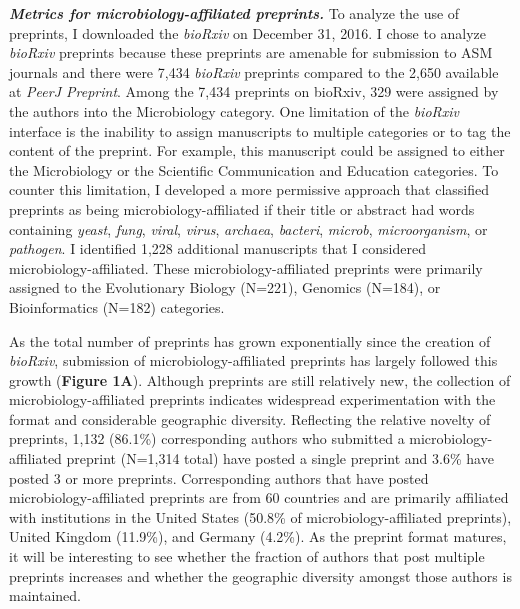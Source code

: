 \documentclass[11pt,]{article}
\begin{document}
\textbf{\emph{Metrics for microbiology-affiliated preprints.}} To
analyze the use of preprints, I downloaded the \emph{bioRxiv} on
December 31, 2016. I chose to analyze \emph{bioRxiv} preprints because
these preprints are amenable for submission to ASM journals and there
were 7,434 \emph{bioRxiv} preprints compared to the 2,650 available at
\emph{PeerJ Preprint}. Among the 7,434 preprints on bioRxiv, 329 were
assigned by the authors into the Microbiology category. One limitation
of the \emph{bioRxiv} interface is the inability to assign manuscripts
to multiple categories or to tag the content of the preprint. For
example, this manuscript could be assigned to either the Microbiology or
the Scientific Communication and Education categories. To counter this
limitation, I developed a more permissive approach that classified
preprints as being microbiology-affiliated if their title or abstract
had words containing \emph{yeast}, \emph{fung}, \emph{viral},
\emph{virus}, \emph{archaea}, \emph{bacteri}, \emph{microb},
\emph{microorganism}, or \emph{pathogen}. I identified 1,228 additional
manuscripts that I considered microbiology-affiliated. These
microbiology-affiliated preprints were primarily assigned to the
Evolutionary Biology (N=221), Genomics (N=184), or Bioinformatics
(N=182) categories.

As the total number of preprints has grown exponentially since the
creation of \emph{bioRxiv}, submission of microbiology-affiliated
preprints has largely followed this growth (\textbf{Figure 1A}).
Although preprints are still relatively new, the collection of
microbiology-affiliated preprints indicates widespread experimentation
with the format and considerable geographic diversity. Reflecting the
relative novelty of preprints, 1,132 (86.1\%) corresponding authors who
submitted a microbiology-affiliated preprint (N=1,314 total) have posted
a single preprint and 3.6\% have posted 3 or more preprints.
Corresponding authors that have posted microbiology-affiliated preprints
are from 60 countries and are primarily affiliated with institutions in
the United States (50.8\% of microbiology-affiliated preprints), United
Kingdom (11.9\%), and Germany (4.2\%). As the preprint format matures,
it will be interesting to see whether the fraction of authors that post
multiple preprints increases and whether the geographic diversity
amongst those authors is maintained.
\end{document}
